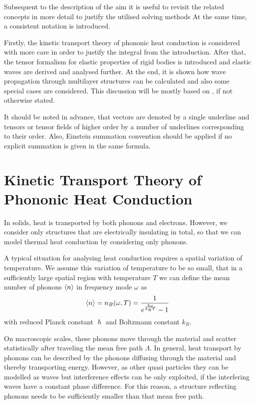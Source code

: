 Subsequent to the description of the aim it is useful to revisit the related
concepts in more detail to justify the utilised solving methods
At the same time, a consistent notation is introduced.

Firstly, the kinetic transport theory of phononic heat conduction is considered
with more care in order to justify the integral from the introduction.
After that, the tensor formalism for elastic properties
of rigid bodies is introduced and elastic waves are derived and
analysed further. At the end, it is shown how wave propagation through
multilayer structures can be calculated and also some special cases are
considered. This discussion will be mostly based on \cite{GrossMarx2014},
if not otherwise stated.

It should be noted in advance, that vectors are
denoted by a single underline and tensors or
tensor fields of higher order by a number of underlines corresponding to their
order. Also, Einstein summation convention should be applied if no explicit
summation is given in the same formula.

\section{Kinetic Transport Theory of Phononic Heat Conduction}
In solids, heat is transported by both phonons and electrons.  However, we
consider only structures that are electrically insulating in total, so that
we can model thermal heat conduction by considering only phonons.

A typical situation for analysing heat conduction requires a spatial variation
of temperature. We assume this variation of temperature to be so small, that in
a sufficiently large spatial region with temperature $T$ we can define the mean
number of phonons $\expval{n}$ in frequency mode $\omega$ as
\begin{equation}
    \expval{n} = n_B(\omega,T) = \frac{1}{e^{\frac{\hslash \omega}{k_BT}} - 1 }
\end{equation}
with reduced Planck constant $\hslash$ and Boltzmann constant $k_B$.

On macroscopic scales, these phonons move through the material and scatter
statistically after traveling the mean free path $\Lambda$. In general,
heat transport by phonons can be described by the phonons diffusing through
the material and thereby transporting energy. However, as other quasi
particles they can be modelled as waves but interference effects can be only
exploited, if the interfering waves have a constant phase difference. For this
reason, a structure reflecting phonons needs to be sufficiently smaller than
that mean free path.

